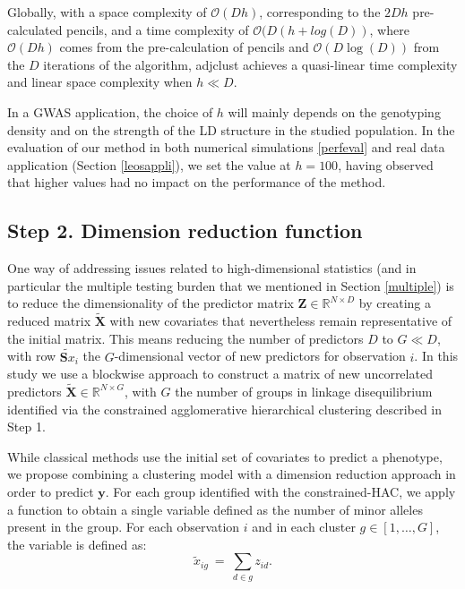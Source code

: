 \documentclass[]{book}
\begin{document}
Globally, with a space complexity of \(\mathcal{O}(Dh)\), corresponding to
the \(2Dh\) pre-calculated pencils, and a time complexity of
\(\mathcal{O}(D(h + log(D))\), where \(\mathcal{O}(Dh)\) comes from the
pre-calculation of pencils and \(\mathcal{O}(D\log(D))\) from the \(D\)
iterations of the algorithm, adjclust achieves a quasi-linear time
complexity and linear space complexity when \(h \ll D\).

In a GWAS application, the choice of \(h\) will mainly depends on the
genotyping density and on the strength of the LD structure in the
studied population. In the evaluation of our method in both numerical
simulations \ref{perfeval} and real data application (Section
\ref{leosappli}), we set the value at \(h = 100\), having observed
that higher values had no impact on the performance of the method.

\hypertarget{Dstar}{%
\subsection{Step 2. Dimension reduction function}\label{Dstar}}

One way of addressing issues related to high-dimensional statistics (and
in particular the multiple testing burden that we mentioned in Section
\ref{multiple}) is to reduce the dimensionality of the predictor
matrix \(\mathbf{Z} \in \mathbb{R}^{N \times D}\) by creating a reduced matrix
\(\tilde{\mathbf{X}}\) with new covariates that nevertheless remain
representative of the initial matrix. This means reducing the number of
predictors \(D\) to \(G \ll D\), with row \(\tilde{\mathbf{S}x}_{i}\) the
\(G\)-dimensional vector of new predictors for observation \(i\). In this
study we use a blockwise approach to construct a matrix of new
uncorrelated predictors \(\tilde{\mathbf{X}} \in \mathbb{R}^{N \times G}\),
with \(G\) the number of groups in linkage disequilibrium identified via
the constrained agglomerative hierarchical clustering described in Step 1.

While classical methods use the initial set of covariates to predict a
phenotype, we propose combining a clustering model with a dimension
reduction approach in order to predict \(\mathbf{y}\). For each group identified
with the constrained-HAC, we apply a function to obtain a single
variable defined as the number of minor alleles present in the group.
For each observation \(i\) and in each cluster \(g \in \left[1,\dots,G\right]\), the variable is defined as:
\[\label{eq:aggregfun}
  \tilde{x}_{ig}~=~\sum_{d \in g} z_{id}.\]
\end{document}
